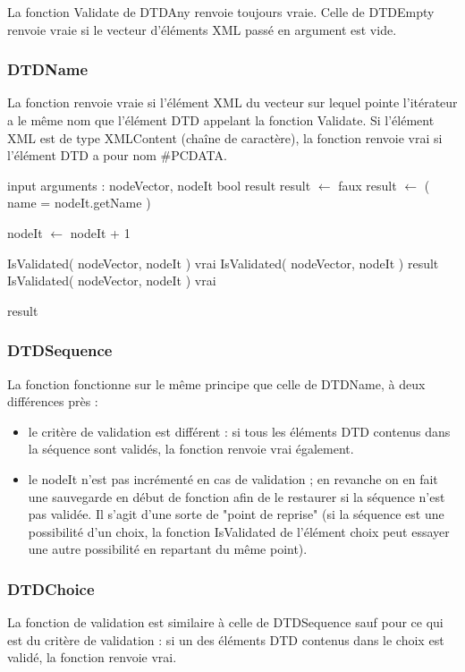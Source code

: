 La fonction Validate de DTDAny renvoie toujours vraie. Celle de DTDEmpty
renvoie vraie si le vecteur d'éléments XML passé en argument est vide.

\subsubsection{DTDName}

La fonction renvoie vraie si l'élément XML du vecteur sur lequel pointe
l'itérateur a le même nom que l'élément DTD appelant la fonction Validate.
Si l'élément XML est de type XMLContent (chaîne de caractère), la fonction
renvoie vrai si l'élément DTD a pour nom \#PCDATA. \\

\begin{algorithmic}
\STATE input arguments : nodeVector, nodeIt
\STATE bool result
\STATE result $\gets$ faux
\ELSE
\STATE result $\gets$ ( name = nodeIt.getName )
\ENDIF

\STATE nodeIt $\gets$ nodeIt + 1
\ENDIF

    \STATE IsValidated( nodeVector, nodeIt )
    \ENDIF
    \RETURN vrai
    \STATE IsValidated( nodeVector, nodeIt )
    \ENDIF
    \RETURN result
    \STATE IsValidated( nodeVector, nodeIt )
    \ENDIF
    \RETURN vrai
\ENDIF

\RETURN result

\end{algorithmic}


\subsubsection{DTDSequence}

La fonction fonctionne sur le même principe que celle de DTDName, à deux
différences près : 
\begin{itemize}
\item le critère de validation est différent : si tous les éléments DTD
contenus dans la séquence sont validés, la fonction renvoie vrai également.
\item le nodeIt n'est pas incrémenté en cas de validation ; en revanche on
en fait une sauvegarde en début de fonction afin de le restaurer si la
séquence n'est pas validée. Il s'agit d'une sorte de "point de reprise" (si
la séquence est une possibilité d'un choix, la fonction IsValidated de
l'élément choix peut essayer une autre possibilité en repartant du même
point).
\end{itemize}

\subsubsection{DTDChoice}

La fonction de validation est similaire à celle de DTDSequence sauf pour ce
qui est du critère de validation : si un des éléments DTD contenus dans le choix est validé, la fonction
renvoie vrai.

